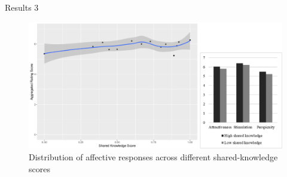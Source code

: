 \begin{frame}[allowframebreaks]{Results 3}
    \begin{figure}[tb]
     \begin{center}
      \includegraphics[width=120mm]{images/rqb_affective-response-redraw.pdf}
      \end{center}
      \caption{Distribution  of  affective  responses  across  different  shared-knowledge scores}
      \label{rqb::affective}  
    \end{figure}
\end{frame}
